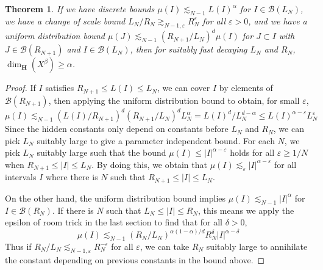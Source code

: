\documentclass{report}
\theoremstyle{plain}
\theoremstyle{plain}
\newtheorem{theorem}{Theorem}
\newtheorem*{remark}{Remark}
\begin{document}
\begin{theorem}
    If we have discrete bounds $\mu(I) \lesssim_{N-1} L(I)^\alpha$ for $I \in \mathcal{B}(L_N)$, we have a change of scale bound $L_N/R_N \gtrsim_{N-1,\varepsilon} R_N^\varepsilon$ for all $\varepsilon > 0$, and we have a uniform distribution bound $\mu(J) \lesssim_{N-1} (R_{N+1}/L_N)^d \mu(I)$ for $J \subset I$ with $J \in \mathcal{B}(R_{N+1})$ and $I \in \mathcal{B}(L_N)$, then for suitably fast decaying $L_N$ and $R_N$, $\dim_{\mathbf{H}}(X^\beta) \geq \alpha$.
\end{theorem}
\begin{proof}
    If $I$ satisfies $R_{N+1} \leq L(I) \leq L_N$, we can cover $I$ by elements of $\mathcal{B}(R_{N+1})$, then applying the uniform distribution bound to obtain, for small $\varepsilon$,
    \[ \mu(I) \lesssim_{N-1} (L(I)/R_{N+1})^d (R_{N+1}/L_N)^d L_N^\alpha = L(I)^d / L_N^{d-\alpha} \leq L(I)^{\alpha-\varepsilon} L_N^\varepsilon \]
    Since the hidden constants only depend on constants before $L_N$ and $R_N$, we can pick $L_N$ suitably large to give a parameter independent bound. For each $N$, we pick $L_N$ suitably large such that the bound $\mu(I) \leq |I|^{\alpha - \varepsilon}$ holds for all $\varepsilon \geq 1/N$ when $R_{N+1} \leq |I| \leq L_N$. By doing this, we obtain that $\mu(I) \lesssim_\varepsilon |I|^{\alpha - \varepsilon}$ for all intervals $I$ where there is $N$ such that $R_{N+1} \leq |I| \leq L_N$.

    On the other hand, the uniform distribution bound implies $\mu(I) \lesssim_{N-1} |I|^\alpha$ for $I \in \mathcal{B}(R_N)$. If there is $N$ such that $L_N \leq |I| \leq R_N$, this means we apply the epsilon of room trick in the last section to find that for all $\delta > 0$,
%
\[ \mu(I) \lesssim_{N-1} \left( R_N/L_N \right)^{\alpha(1 - \alpha)/d} R_N^\delta |I|^{\alpha - \delta} \]
%
Thus if $R_N/L_N \lesssim_{N-1,\varepsilon} R_N^{-\varepsilon}$ for all $\varepsilon$, we can take $R_N$ suitably large to annihilate the constant depending on previous constants in the bound above.
\end{proof}

\end{document}
